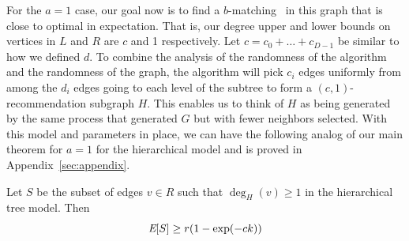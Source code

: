 For the $a=1$ case, our goal now is to find a $b$-matching~\cite{Gabow1983} in this
graph that is close to optimal in expectation. That is, our degree
upper and lower bounds on vertices in $L$ and $R$ are $c$ and 1
respectively. Let $c = c_0 + \ldots + c_{D-1}$ be similar to how we
defined $d$.  To combine the analysis of the randomness of the
algorithm and the randomness of the graph, the algorithm will pick
$c_{i}$ edges uniformly from among the $d_{i}$ edges going to each
level of the subtree to form a $(c,1)$-recommendation subgraph $H$.
This enables us to think of $H$ as being generated by the same process that generated $G$
but with fewer neighbors selected. With this model and
parameters in place, we can have the following analog of our main
theorem for $a=1$ for the hierarchical model and is proved in Appendix~\ref{sec:appendix}.

\begin{thm}
Let $S$ be the subset of edges $v\in R$ such that $\deg_H(v) \geq 1$ in the hierarchical tree model. Then
\[ \emph{\text{E}}[S] \geq r(1-\exp(-ck)) \]
\end{thm}

%
%

